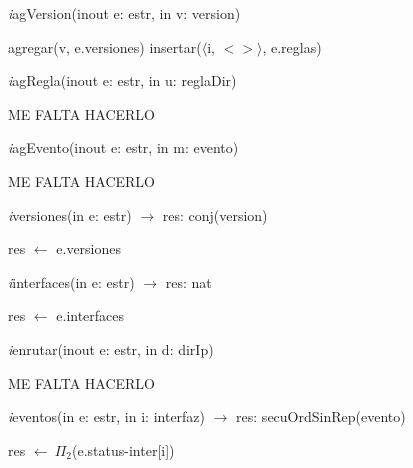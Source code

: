 \vspace{11pt}

\textit{i}agVersion(inout e: estr, in v: version)\\
\begin{algorithm}[H]
\BlankLine
agregar(v, e.versiones)
\BlankLine
insertar($\langle$i, $<>\rangle$, e.reglas)
\end{algorithm}

\vspace{11pt}

\textit{i}agRegla(inout e: estr, in u: reglaDir)\\
\begin{algorithm}[H]
\BlankLine
ME FALTA HACERLO
\end{algorithm}

\vspace{11pt}

\textit{i}agEvento(inout e: estr, in m: evento)\\
\begin{algorithm}[H]
ME FALTA HACERLO
\end{algorithm}

\vspace{11pt}

\textit{i}versiones(in e: estr) $\longrightarrow$ res: conj(version)\\
\begin{algorithm}[H]
\BlankLine
res $\leftarrow$ e.versiones
\end{algorithm}

\vspace{11pt}

\textit{i}interfaces(in e: estr) $\longrightarrow$ res: nat\\
\begin{algorithm}[H]
\BlankLine
res $\leftarrow$ e.interfaces
\end{algorithm}

\vspace{11pt}

\textit{i}enrutar(inout e: estr, in d: dirIp)\\
\begin{algorithm}[H]
\BlankLine
ME FALTA HACERLO
\end{algorithm}

\vspace{11pt}

\textit{i}eventos(in e: estr, in i: interfaz) $\longrightarrow$ res: secuOrdSinRep(evento)\\
\begin{algorithm}[H]
\BlankLine
res $\leftarrow\ \Pi_2$(e.status-inter[i])
\end{algorithm}

